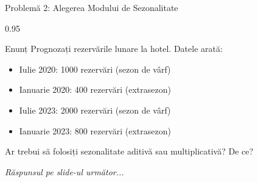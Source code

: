 \documentclass[9pt, aspectratio=169, t]{beamer}
\begin{document}
\begin{frame}{Problemă 2: Alegerea Modului de Sezonalitate}
    \begin{cminipage}{0.95\textwidth}
    \begin{block}{Enunț}
        Prognozați rezervările lunare la hotel. Datele arată:
        \begin{itemize}\setlength{\itemsep}{0pt}
            \item Iulie 2020: 1000 rezervări (sezon de vârf)
            \item Ianuarie 2020: 400 rezervări (extrasezon)
            \item Iulie 2023: 2000 rezervări (sezon de vârf)
            \item Ianuarie 2023: 800 rezervări (extrasezon)
        \end{itemize}

        Ar trebui să folosiți sezonalitate aditivă sau multiplicativă? De ce?
    \end{block}

    \vspace{0.5cm}
    \begin{flushright}\textit{Răspunsul pe slide-ul următor...}\end{flushright}
    \end{cminipage}
\end{frame}
\end{document}
